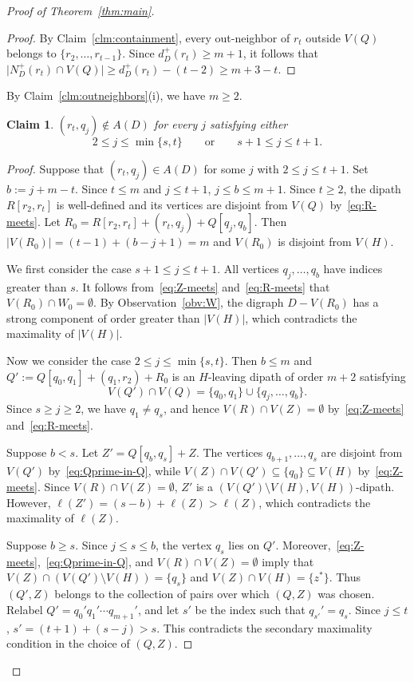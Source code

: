 \documentclass[10pt,a4paper]{amsart}
\newtheorem{claim}{Claim}
\begin{document}
\begin{proof}[Proof of Theorem~\ref{thm:main}]
\begin{proof}
By Claim~\ref{clm:containment}, every out-neighbor of $r_t$ outside $V(Q)$ belongs to $\{r_2,\ldots,r_{t-1}\}$.
Since $d_D^+(r_t)\ge m+1$, it follows that $\bigl|N_D^+(r_t)\cap V(Q)\bigr|\ge d_D^+(r_t)-(t-2)\ge m+3-t$.
\end{proof}

By Claim~\ref{clm:outneighbors}(i), we have $m\ge2$.

\smallskip
\begin{claim}\label{clm:rotation}
$(r_t,q_j)\notin A(D)$ for every $j$ satisfying either
\[
2\le j\le\min\{s,t\} \qquad \text{or} \qquad s+1\le j\le t+1.
\]
\end{claim}

\begin{proof}
Suppose that $(r_t,q_j)\in A(D)$ for some $j$ with $2\le j\le t+1$. Set $b:=j+m-t$.
Since $t\le m$ and $j\le t+1$, $j\le b\le m+1$.
Since $t\ge2$, the dipath $R[r_2,r_t]$ is well-defined and its vertices are disjoint from $V(Q)$ by~\eqref{eq:R-meets}.
Let $R_0=R[r_2,r_t]+(r_t,q_j)+Q[q_j,q_b]$.
Then $|V(R_0)|=(t-1)+(b-j+1)=m$ and $V(R_0)$ is disjoint from $V(H)$.

We first consider the case $s+1\le j\le t+1$.
All vertices $q_j,\ldots,q_b$ have indices greater than $s$.
It follows from~\eqref{eq:Z-meets} and~\eqref{eq:R-meets} that $V(R_0)\cap W_0=\emptyset$.
By Observation~\ref{obv:W}, the digraph $D-V(R_0)$ has a strong component of order greater than $|V(H)|$, which contradicts the maximality of $|V(H)|$.

Now we consider the case $2\le j\le\min\{s,t\}$.
Then $b\le m$ and $Q':=Q[q_0,q_1]+(q_1,r_2)+R_0$ is an $H$-leaving dipath of order $m+2$ satisfying
\begin{equation}\label{eq:Qprime-in-Q}
V(Q')\cap V(Q)=\{q_0,q_1\}\cup\{q_j,\ldots,q_b\}.
\end{equation}
Since $s\ge j\ge2$, we have $q_1\ne q_s$, and hence $V(R)\cap V(Z)=\emptyset$ by~\eqref{eq:Z-meets} and~\eqref{eq:R-meets}.

Suppose $b<s$.
Let $Z'=Q[q_b,q_s]+Z$.
The vertices $q_{b+1},\ldots,q_s$ are disjoint from $V(Q')$ by~\eqref{eq:Qprime-in-Q}, while $V(Z)\cap V(Q')\subseteq\{q_0\}\subseteq V(H)$ by~\eqref{eq:Z-meets}.
Since $V(R)\cap V(Z)=\emptyset$, $Z'$ is a $(V(Q')\setminus V(H),V(H))$-dipath.
However, $\ell(Z')=(s-b)+\ell(Z)>\ell(Z)$, which contradicts the maximality of $\ell(Z)$.

Suppose $b\ge s$.
Since $j\le s\le b$, the vertex $q_s$ lies on $Q'$.
Moreover,~\eqref{eq:Z-meets},~\eqref{eq:Qprime-in-Q}, and $V(R)\cap V(Z)=\emptyset$ imply that $V(Z)\cap(V(Q')\setminus V(H))=\{q_s\}$ and $V(Z)\cap V(H)=\{z^*\}$.
Thus $(Q',Z)$ belongs to the collection of pairs over which $(Q,Z)$ was chosen.
Relabel $Q'=q_0'q_1'\cdots q_{m+1}'$, and let $s'$ be the index such that $q_{s'}'=q_s$.
Since $j\le t$, $s'=(t+1)+(s-j)>s$.
This contradicts the secondary maximality condition in the choice of $(Q,Z)$.
\end{proof}


\end{proof}
\end{document}
